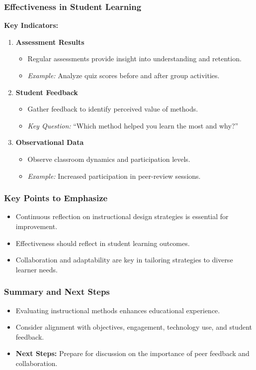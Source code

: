 \documentclass[aspectratio=169]{beamer}
\begin{document}
\begin{frame}[fragile]
    \frametitle{Effectiveness in Student Learning}
    \textbf{Key Indicators:}
    \begin{enumerate}
        \item \textbf{Assessment Results}
            \begin{itemize}
                \item Regular assessments provide insight into understanding and retention.
                \item \textit{Example:} Analyze quiz scores before and after group activities.
            \end{itemize}
        
        \item \textbf{Student Feedback}
            \begin{itemize}
                \item Gather feedback to identify perceived value of methods.
                \item \textit{Key Question:} “Which method helped you learn the most and why?”
            \end{itemize}
        
        \item \textbf{Observational Data}
            \begin{itemize}
                \item Observe classroom dynamics and participation levels.
                \item \textit{Example:} Increased participation in peer-review sessions.
            \end{itemize}
    \end{enumerate}
\end{frame}

\begin{frame}[fragile]
    \frametitle{Key Points to Emphasize}
    \begin{itemize}
        \item Continuous reflection on instructional design strategies is essential for improvement.
        \item Effectiveness should reflect in student learning outcomes.
        \item Collaboration and adaptability are key in tailoring strategies to diverse learner needs.
    \end{itemize}
\end{frame}

\begin{frame}[fragile]
    \frametitle{Summary and Next Steps}
    \begin{itemize}
        \item Evaluating instructional methods enhances educational experience.
        \item Consider alignment with objectives, engagement, technology use, and student feedback.
        \item \textbf{Next Steps:} Prepare for discussion on the importance of peer feedback and collaboration.
    \end{itemize}
\end{frame}
\end{document}

